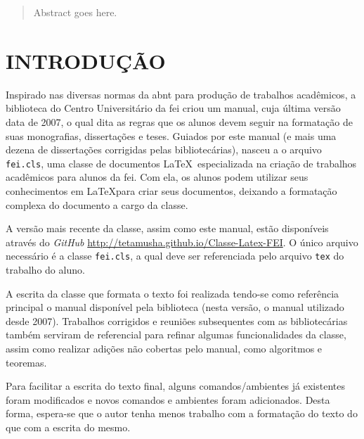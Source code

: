 \documentclass[xindy,rascunho]{fei}
\begin{document}
\begin{abstract}
Abstract goes here.
\end{abstract}

\listoffigures
\listoftables
\listofalgorithms
\listoftheorems
\printglossaries
\tableofcontents

\chapter{INTRODUÇÃO}

Inspirado nas diversas normas da \gls{abnt} para produção de trabalhos acadêmicos, a biblioteca do Centro Universitário da \gls{fei} criou um manual, cuja última versão data de 2007, o qual dita as regras que os alunos devem seguir na formatação de suas monografias, dissertações e teses. Guiados por este manual (e mais uma dezena de dissertações corrigidas pelas bibliotecárias), nasceu a o arquivo \texttt{fei.cls}, uma classe de documentos \LaTeX\ especializada na criação de trabalhos acadêmicos para alunos da \gls{fei}. Com ela, os alunos podem utilizar seus conhecimentos em \LaTeX para criar seus documentos, deixando a formatação complexa do documento a cargo da classe.

A versão mais recente da classe, assim como este manual, estão disponíveis através do \emph{GitHub} \url{http://tetamusha.github.io/Classe-Latex-FEI}. O único arquivo necessário é a classe \texttt{fei.cls}, a qual deve ser referenciada pelo arquivo \texttt{tex} do trabalho do aluno.

A escrita da classe que formata o texto foi realizada tendo-se como referência principal o manual disponível pela biblioteca (nesta versão, o manual utilizado desde 2007). Trabalhos corrigidos e reuniões subsequentes com as bibliotecárias também serviram de referencial para refinar algumas funcionalidades da classe, assim como realizar adições não cobertas pelo manual, como algoritmos e teoremas.

Para facilitar a escrita do texto final, alguns comandos/ambientes já existentes foram modificados e novos comandos e ambientes foram adicionados. Desta forma, espera-se que o autor tenha menos trabalho com a formatação do texto do que com a escrita do mesmo.
\end{document}
